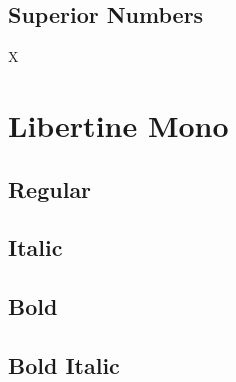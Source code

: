 \documentclass{article}
\begin{document}
\subsection*{Superior Numbers}

X

\clearpage
\section{Libertine Mono}\tt

\subsection*{Regular}
\lipsum[1]


\subsection*{Italic}
\textit{\lipsum[2]}

\subsection*{Bold}
\textbf{\lipsum[3]}

\subsection*{Bold Italic}

\textbf{\textit{\lipsum[4]}}

\clearpage
\end{document}
